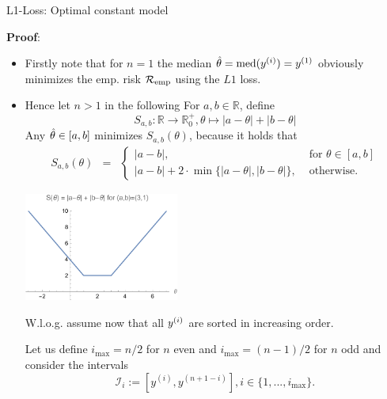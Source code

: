 \documentclass[11pt,compress,t,notes=noshow, xcolor=table]{beamer}
\begin{document}
\begin{vbframe}{L1-Loss: Optimal constant model}

\textbf{Proof}: 

\begin{itemize}
  \item Firstly note that for $n = 1$ the median $\hat{\theta} = \text{med}(y^{(i)}) = y^{(1)}$ obviously minimizes the emp. risk $\mathcal{R}_{\text{emp}}$ using the $L1$ loss. 



  \item Hence let $n > 1$ in the following For $a,b \in \mathbb{R}$, define 
  $$
    S_{a,b}:\mathbb{R} \rightarrow \mathbb{R}^+_0, \theta \mapsto |a- \theta| + |b-\theta|
  $$
  \vspace*{-0.3cm}
  Any $\hat{\theta} \in [a,b]$ minimizes $S_{a,b}(\theta)$, because it holds that
  \vspace*{-0.0cm}
  \begin{eqnarray*}
  S_{a,b}(\theta) &=& \begin{cases}|a-b| ,& \text{ for } \theta \in [a,b]\\ |a-b| + 2\cdot\min\{|a-\theta|,|b-\theta|\}
  ,& \text{ otherwise. }\end{cases}
  \end{eqnarray*}

\vspace*{-0.15cm}

\begin{center}
\includegraphics[width = 0.4\textwidth ]{figure_man/S_function_plot.pdf} \\
\end{center}



  \framebreak

  W.l.o.g. assume now that all $y^{(i)}$ are sorted in increasing order.

  Let us define $i_{\max} = n / 2$ for $n$ even and $i_{\max} = (n - 1) / 2$ for $n$ odd and consider the intervals 
  $$
    \mathcal{I}_i := [y^{(i)},y^{(n+1-i)}], i \in \{1, ..., i_{\max}\}. 
  $$


\end{itemize}
\end{vbframe}
\end{document}
